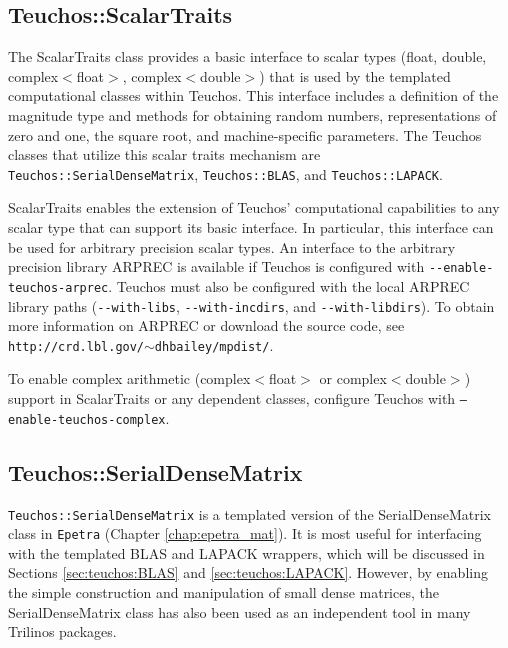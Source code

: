 
\subsection{Teuchos::ScalarTraits}
\label{sec:teuchos:ScalarTraits}

The ScalarTraits class provides a basic interface to scalar types (float, double, 
complex$<$float$>$, complex$<$double$>$) that is used by the templated 
computational classes within Teuchos.  This interface includes a definition of
the magnitude type and methods for obtaining random numbers, representations of 
zero and one, the square root, and machine-specific parameters.  
The Teuchos classes that utilize this scalar traits mechanism are 
\verb!Teuchos::SerialDenseMatrix!, \verb!Teuchos::BLAS!, and \verb!Teuchos::LAPACK!.  

ScalarTraits enables the extension of Teuchos' computational
capabilities to any scalar type that can support its basic interface.  In particular, 
this interface can be used for arbitrary precision scalar types.  An interface to the
arbitrary precision library ARPREC \cite{arprec:02} is available if Teuchos
is configured with \verb!--enable-teuchos-arprec!. Teuchos must also be configured
with the local ARPREC library paths (\verb!--with-libs!, \verb!--with-incdirs!, and 
\verb!--with-libdirs!).  To obtain more information on ARPREC or download the 
source code, see {\tt http://crd.lbl.gov/$\sim$dhbailey/mpdist/}.

\begin{remark} To enable complex arithmetic (complex$<$float$>$ or complex$<$double$>$) 
support in ScalarTraits or any dependent classes, configure Teuchos with {\tt --enable-teuchos-complex}.
\end{remark}


\subsection{Teuchos::SerialDenseMatrix}
\label{sec:teuchos:SDM}

\verb!Teuchos::SerialDenseMatrix! is a templated version of the SerialDenseMatrix class in \verb!Epetra!
(Chapter \ref{chap:epetra_mat}).  It is most useful for interfacing with the templated BLAS and 
LAPACK wrappers, which will be discussed in Sections \ref{sec:teuchos:BLAS} and \ref{sec:teuchos:LAPACK}.  
However, by enabling the simple construction and manipulation of small dense matrices, 
the SerialDenseMatrix class has also been used as an independent tool in many 
Trilinos packages.

